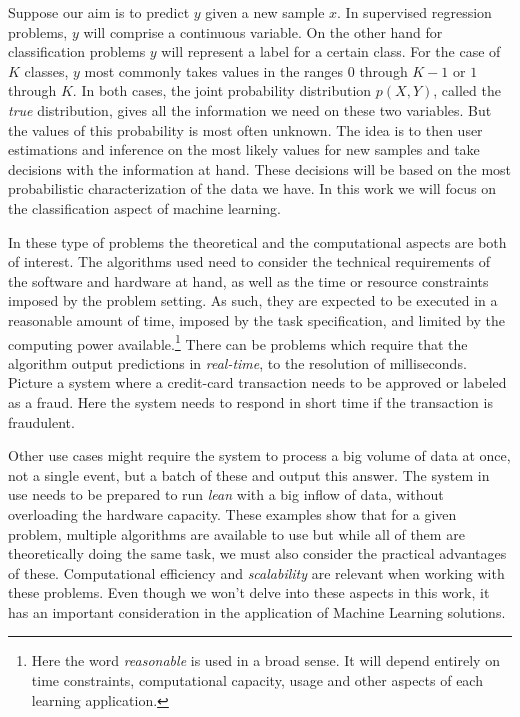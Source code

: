 Suppose our aim is to predict $y$ given a new sample $x$. In supervised regression problems, $y$ will comprise a continuous variable. On the other hand for classification problems $y$ will represent a label for a certain class. For the case of $K$ classes, $y$ most commonly takes values in the ranges $0$ through $K-1$ or $1$ through $K$. In both cases, the joint probability distribution $p(X, Y)$, called the \textit{true} distribution, gives all the information we need on these two variables. But the values of this probability is most often unknown. The idea is to then user estimations and inference on the most likely values for new samples and take decisions with the information at hand. These decisions will be based on the most probabilistic characterization of the data we have. In this work we will focus on the classification aspect of machine learning.

In these type of problems the theoretical and the computational aspects are both of interest. The algorithms used need to consider the technical requirements of the software and hardware at hand, as well as the time or resource constraints imposed by the problem setting. As such, they are expected to be executed in a reasonable amount of time, imposed by the task specification, and limited by the computing power available.\footnote{Here the word \textit{reasonable} is used in a broad sense. It will depend entirely on time constraints, computational capacity, usage and other aspects of each learning application.} There can be problems which require that the algorithm output predictions in \textit{real-time}, to the resolution of milliseconds. Picture a system where a credit-card transaction needs to be approved or labeled as a fraud. Here the system needs to respond in short time if the transaction is fraudulent.

Other use cases might require the system to process a big volume of data at once, not a single event, but a batch of these and output this answer. The system in use needs to be prepared to run \textit{lean} with a big inflow of data, without overloading the hardware capacity. These examples show that for a given problem, multiple algorithms are available to use but while all of them are theoretically doing the same task, we must also consider the practical advantages of these. Computational efficiency and \textit{scalability} are relevant when working with these problems. Even though we won't delve into these aspects in this work, it has an important consideration in the application of Machine Learning solutions.


